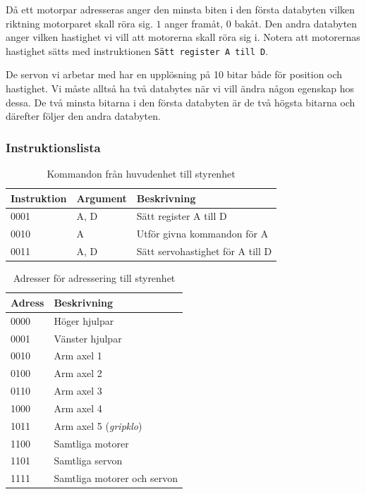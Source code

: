 Då ett motorpar adresseras anger den minsta biten i den första databyten vilken riktning motorparet skall röra sig. $1$ anger framåt, $0$ bakåt. Den andra databyten anger vilken hastighet vi vill att motorerna skall röra sig i. Notera att motorernas hastighet sätts med instruktionen \texttt{Sätt register A till D}.

De servon vi arbetar med har en upplösning på 10 bitar både för position och hastighet. Vi måste alltså ha två databytes när vi vill ändra någon egenskap hos dessa. De två minsta bitarna i den första databyten är de två högsta bitarna och därefter följer den andra databyten.

\subsubsection{Instruktionslista}

\begin{table}[h!]
	\centering
	\begin{tabularx}{\textwidth}{| l | l | X |}
		\hline
		\textbf{Instruktion} & \textbf{Argument} & \textbf{Beskrivning} \\\hline
		{0001} & {A, D} & {Sätt register A till D} \\\hline
		{0010} & {A} & {Utför givna kommandon för A} \\\hline
		{0011} & {A, D} & {Sätt servohastighet för A till D} \\\hline
	\end{tabularx}
	\caption{Kommandon från huvudenhet till styrenhet} \label{protokoll:pc-motor-tabell}
\end{table}

\begin{table}[h!]
	\centering
	\begin{tabularx}{\textwidth}{| l | X |}
		\hline
		\textbf{Adress} & \textbf{Beskrivning} \\\hline
		{0000} & {Höger hjulpar} \\\hline
		{0001} & {Vänster hjulpar} \\\hline
		{0010} & {Arm axel 1} \\\hline
		{0100} & {Arm axel 2} \\\hline
		{0110} & {Arm axel 3} \\\hline
		{1000} & {Arm axel 4} \\\hline
		{1011} & {Arm axel 5 (\textit{gripklo})} \\\hline
		{1100} & {Samtliga motorer} \\\hline
		{1101} & {Samtliga servon} \\\hline
		{1111} & {Samtliga motorer och servon} \\\hline
	\end{tabularx}
	\caption{Adresser för adressering till styrenhet} \label{protokoll:pc-motor-adress-tabell}
\end{table}

